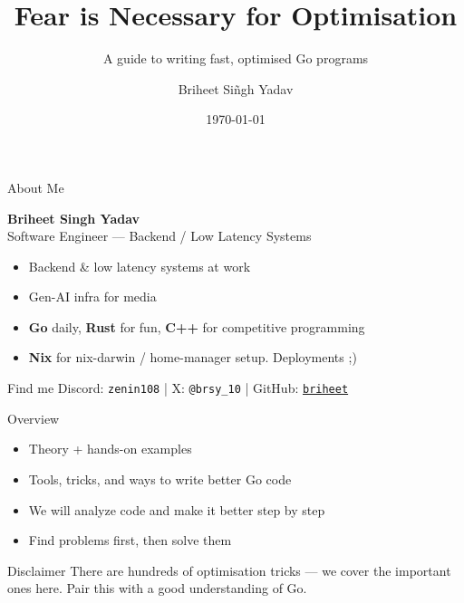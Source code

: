 \documentclass{beamer}
\title{Fear is Necessary for Optimisation}
\subtitle{A guide to writing fast, optimised Go programs}
\date{\today}
\author{Briheet Si\~ngh Yadav}
\institute{\url{https://github.com/briheet}}
\begin{document}
\maketitle

\begin{frame}{About Me}

  \textbf{Briheet Singh Yadav} \\
  Software Engineer --- Backend / Low Latency Systems

  \vspace{0.4cm}
  \begin{itemize}
    \item Backend \& low latency systems at work
    \item Gen-AI infra for media
    \item \textbf{Go} daily, \textbf{Rust} for fun, \textbf{C++} for competitive programming
    \item \textbf{Nix} for nix-darwin / home-manager setup. Deployments ;)
  \end{itemize}

  \vspace{0.4cm}
  \begin{block}{Find me}
    Discord: \texttt{zenin108} \quad | \quad
    X: \texttt{@brsy\_10} \quad | \quad
    GitHub: \href{https://github.com/briheet}{\texttt{briheet}}
  \end{block}

\end{frame}

\begin{frame}{Overview}

  \begin{itemize}
    \item Theory + hands-on examples
    \item Tools, tricks, and ways to write \alert{better} Go code
    \item We will \alert{analyze} code and make it better step by step
    \item Find problems first, then solve them
  \end{itemize}

  \vspace{0.5cm}
  \begin{block}{Disclaimer}
    There are hundreds of optimisation tricks --- we cover the important ones here.
    Pair this with a good understanding of Go.
  \end{block}

\end{frame}
\end{document}

